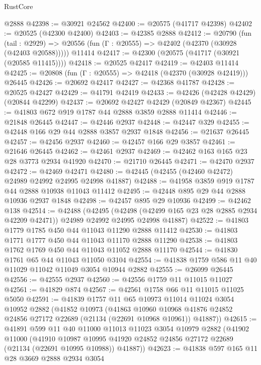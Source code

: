 \begin{lexlean}{RustCore}
\begin{coremodule}
    @2888
@42398 := @30921 @24562
@42400 := @20575 (@41717 @42398)
@42402 := @20525 (@42300 @42400)
@42403 := @42385 @2888
@42412 := @20790
    (fun (tail : @2929) => @20556 (fun (Γ : @20555) => @42402 (@42370 (@30928 (@42403 @20588)))))
    @11414
@42417 := @42300 (@20575 (@41717 (@30921 (@20585 @11415))))
@42418 := @20525 @42417
@42419 := @42403 @11414
@42425 := @20808 (fun (Γ : @20555) => @42418 (@42370 (@30928 @42419))) @26445
@42426 := @20692 @42417
@42427 := @42368 @41787
@42428 := @20525 @42427
@42429 := @41791 @42419
@42433 := @42426 (@42428 @42429) (@20844 @42299)
@42437 := @20692 @42427 @42429 (@20849 @42367)
@42445 := @41803 @672 @919 @1787 @44 @2888 @3859 @2888 @11414
@42446 := @21848 @26445
@42447 := @42446 @2937
@42448 := @42447 @329
@42455 := @42448 @166 @29 @44 @2888 @3857 @2937 @1848
@42456 := @21637 @26445
@42457 := @42456 @2937
@42460 := @42457 @166 @29 @3857
@42461 := @21646 @26445
@42462 := @42461 @2937
@42469 := @42462 @163 @165 @23 @28 @3773 @2934 @41920
@42470 := @21710 @26445
@42471 := @42470 @2937
@42472 := @42469 @42471
@42480 := @42445 (@42455 (@42460 @42472) @24989 @24992 @24995 @24998 @41887)
@42488 := @41958 @3859 @919 @1787 @44 @2888 @10938 @11043 @11412
@42495 := @42448 @895 @29 @44 @2888 @10936 @2937 @1848
@42498 := @42457 @895 @29 @10936
@42499 := @42462 @138
@42514 := @42488
    (@42495
      (@42498 (@42499 @165 @23 @28 @2885 @2934 @42209 @42471))
      @24989
      @24992
      @24995
      @24998
      @41887)
@42522 := @41803 @1779 @1785 @450 @44 @11043 @11290 @2888 @11412
@42530 := @41803 @1771 @1777 @450 @44 @11043 @11170 @2888 @11290
@42538 := @41803 @1762 @1769 @450 @44 @11043 @11052 @2888 @11170
@42544 := @41830 @1761 @65 @44 @11043 @11050 @3104
@42554 := @41838 @1759 @586 @11 @40 @11029 @11042 @11049 @3054 @10944 @2882
@42555 := @26099 @26445
@42556 := @42555 @2937
@42560 := @42556 @1759 @11 @11015 @11027
@42561 := @41829 @874
@42567 := @42561 @1758 @66 @11 @11015 @11025 @5050
@42591 := @41839
    @1757
    @11
    @65
    @10973
    @11014
    @11024
    @3054
    @10952
    @2882
    (@41852
      @10973
      (@41863
        @10960
        @10968
        @41876
        @24852
        @24856
        @27172
        @22689
        (@21134 (@22691 @10968 @10961))
        @41887))
@42615 := @41891
    @599
    @11
    @40
    @11000
    @11013
    @11023
    @3054
    @10979
    @2882
    (@41902
      @11000
      (@41910
        @10987
        @10995
        @41920
        @24852
        @24856
        @27172
        @22689
        (@21134 (@22691 @10995 @10988))
        @41887))
@42623 := @41838 @597 @165 @11 @28 @3669 @2888 @2934 @3054

\end{coremodule}
\end{lexlean}
